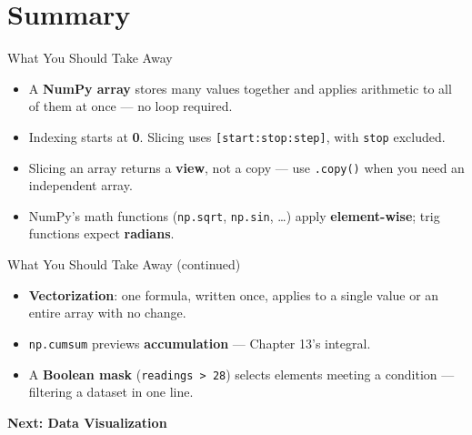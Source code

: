 \documentclass[9pt,aspectratio=169,xcolor=table]{beamer}
\begin{document}
\section{Summary}

\begin{frame}{What You Should Take Away}
    \leavevmode
    \small
    \begin{itemize}
        \item A \textbf{NumPy array} stores many values together and
              applies arithmetic to all of them at once --- no loop
              required.
        \item Indexing starts at \textbf{0}. Slicing uses
              \texttt{[start:stop:step]}, with \texttt{stop} excluded.
        \item Slicing an array returns a \textbf{view}, not a copy ---
              use \texttt{.copy()} when you need an independent array.
        \item NumPy's math functions (\texttt{np.sqrt}, \texttt{np.sin},
              \ldots) apply \textbf{element-wise}; trig functions expect
              \textbf{radians}.
    \end{itemize}
\end{frame}

\begin{frame}{What You Should Take Away (continued)}
    \leavevmode
    \small
    \begin{itemize}
        \item \textbf{Vectorization}: one formula, written once, applies
              to a single value or an entire array with no change.
        \item \texttt{np.cumsum} previews \textbf{accumulation} ---
              Chapter 13's integral.
        \item A \textbf{Boolean mask} (\texttt{readings > 28}) selects
              elements meeting a condition --- filtering a dataset in
              one line.
    \end{itemize}

    \vspace{4mm}
    \begin{center}
        \large\color{primary}\textbf{Next: Data Visualization}
    \end{center}
\end{frame}
\end{document}
